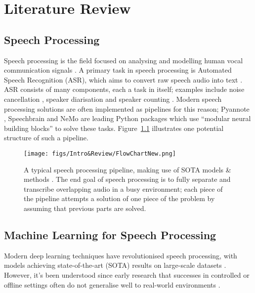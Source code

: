 \chapter{Literature Review}

\section{Speech Processing}
Speech processing is the field focused on analysing and modelling human vocal communication signals \cite{sciencedirect}. A primary task in speech processing is Automated Speech Recognition (ASR), which aims to convert raw speech audio into text \cite{speechprocessing_review}. ASR consists of many components, each a task in itself; examples include noise cancellation \cite{noisecancellation}, speaker diarisation \cite{diarization} and speaker counting \cite{speaker_counting}. Modern speech processing solutions are often implemented as pipelines for this reason; Pyannote \cite{pyannote2020, pyannote2021}, Speechbrain \cite{speechbrain} and NeMo \cite{nemo} are leading Python packages which use ``modular neural building blocks'' to solve these tasks. Figure~\ref{fig:ideal_pipeline} illustrates one potential structure of such a pipeline.

\begin{figure}
\centering
\texttt{[image: figs/Intro\&Review/FlowChartNew.png]}
\caption{A typical speech processing pipeline, making use of SOTA models \& methods \cite{pyannote2020, multidecoder_dprnn,openAIwhisper,cosine_similarity}. The end goal of speech processing is to fully separate and transcribe overlapping audio in a busy environment; each piece of the pipeline attempts a solution of one piece of the problem by assuming that previous parts are solved.}
\label{fig:ideal_pipeline}
\end{figure}


\section{Machine Learning for Speech Processing}
Modern deep learning techniques have revolutionised speech processing, with models achieving state-of-the-art (SOTA) results on large-scale datasets \cite{transformers}. However, it's been understood since early research that successes in controlled or offline settings often do not generalise well to real-world environments \cite{signal_processing_book}.\newline

